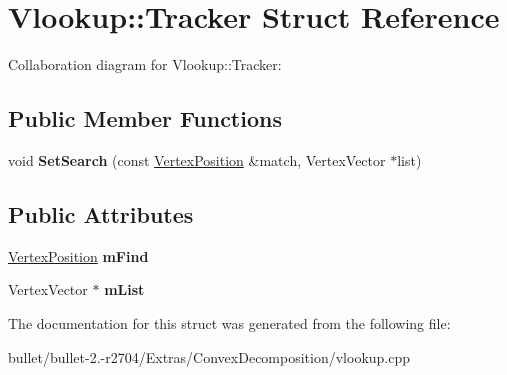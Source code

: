 \hypertarget{struct_vlookup_1_1_tracker}{\section{Vlookup\+:\+:Tracker Struct Reference}
\label{struct_vlookup_1_1_tracker}
}


Collaboration diagram for Vlookup\+:\+:Tracker\+:
\subsection*{Public Member Functions}
\begin{DoxyCompactItemize}
\item 
\hypertarget{struct_vlookup_1_1_tracker_a84ac39ad1acb2c30d0001e9b40f3be94}{void {\bfseries Set\+Search} (const \hyperlink{class_vlookup_1_1_vertex_position}{Vertex\+Position} \&match, Vertex\+Vector $\ast$list)}\label{struct_vlookup_1_1_tracker_a84ac39ad1acb2c30d0001e9b40f3be94}

\end{DoxyCompactItemize}
\subsection*{Public Attributes}
\begin{DoxyCompactItemize}
\item 
\hypertarget{struct_vlookup_1_1_tracker_a349c90fbcb1d335f0b7907f107fe05ee}{\hyperlink{class_vlookup_1_1_vertex_position}{Vertex\+Position} {\bfseries m\+Find}}\label{struct_vlookup_1_1_tracker_a349c90fbcb1d335f0b7907f107fe05ee}

\item 
\hypertarget{struct_vlookup_1_1_tracker_a8a7b1a5b831585691e78d38da80355e5}{Vertex\+Vector $\ast$ {\bfseries m\+List}}\label{struct_vlookup_1_1_tracker_a8a7b1a5b831585691e78d38da80355e5}

\end{DoxyCompactItemize}


The documentation for this struct was generated from the following file\+:\begin{DoxyCompactItemize}
\item 
bullet/bullet-\/2.-\/r2704/\+Extras/\+Convex\+Decomposition/vlookup.\+cpp\end{DoxyCompactItemize}
